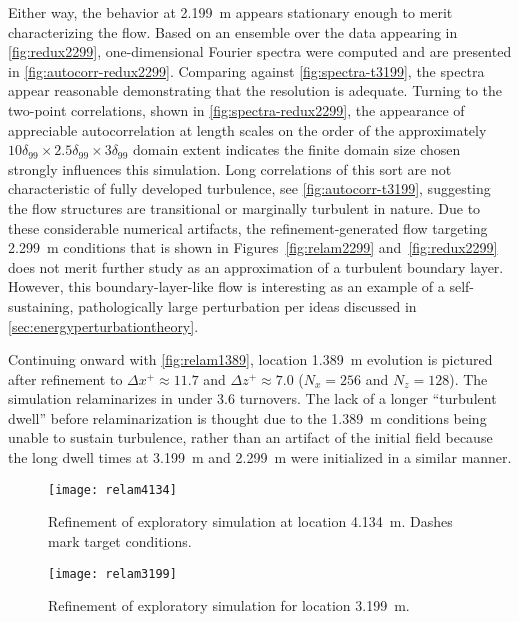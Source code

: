 Either way, the behavior at 2.199~m appears stationary enough to merit
characterizing the flow.  Based on an ensemble over the data appearing in
\autoref{fig:redux2299}, one-dimensional Fourier spectra were computed and are
presented in \autoref{fig:autocorr-redux2299}.  Comparing against
\autoref{fig:spectra-t3199}, the spectra appear reasonable demonstrating that
the resolution is adequate.  Turning to the two-point correlations, shown in
\autoref{fig:spectra-redux2299},
the appearance of appreciable autocorrelation at length scales on the order of the
approximately $10\delta_{99}\times2.5\delta_{99}\times3\delta_{99}$
domain extent
indicates the finite domain size chosen strongly influences this simulation.
%
Long correlations of this sort are not characteristic of fully developed
turbulence, see \autoref{fig:autocorr-t3199}, suggesting the flow structures are
transitional or marginally turbulent in nature.
%
Due to these
considerable numerical artifacts, the refinement-generated flow targeting
2.299~m conditions that is shown in Figures~\ref{fig:relam2299}
and~\ref{fig:redux2299} does not merit further study as an approximation of a turbulent boundary layer.  However,
this boundary-layer-like flow is interesting as an example of a
self-sustaining, pathologically large perturbation per ideas discussed in
\autoref{sec:energyperturbationtheory}.

Continuing onward with \autoref{fig:relam1389}, location 1.389~m evolution is
pictured after refinement to $\Delta{}x^{+}\approx{}11.7$ and
$\Delta{}z^{+}\approx{}7.0$ ($N_x = 256$ and $N_z=128$).  The simulation
relaminarizes in under 3.6 turnovers.  The lack of a longer ``turbulent dwell''
before relaminarization is thought due to the 1.389~m conditions being unable to sustain
turbulence, rather than an artifact of the initial
field because the long dwell times at 3.199~m and 2.299~m were initialized
in a similar manner.

\begin{figure}
\centering\texttt{[image: relam4134]}
\caption[Refinement of coarse exploratory simulation for location 4.134~m]{%
    Refinement of exploratory simulation at location 4.134~m.\label{fig:relam4134}
    Dashes mark target conditions.
}
\end{figure}

\begin{figure}
\centering\texttt{[image: relam3199]}
\caption{Refinement of exploratory simulation for location 3.199~m.\label{fig:relam3199}}
\end{figure}

